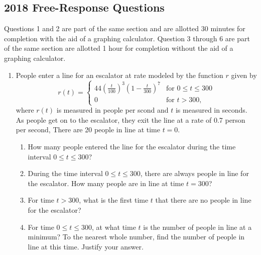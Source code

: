 \subsection{2018 Free-Response Questions}
Questions 1 and 2 are part of the same section and are allotted 30 minutes for completion with the aid of a graphing calculator.
Question 3 through 6 are part of the same section are allotted 1 hour for completion without the aid of a graphing calculator.

\begin{enumerate}
	\item People enter a line for an escalator at  rate modeled by the function $r$ given by
	\begin{equation*}
		r(t) = \begin{cases}
			44\left(\frac{t}{100}\right)^3\left(1-\frac{t}{300}\right)^7 & \text{for } 0 \leq t \leq 300 \\
			0 & \text{for } t > 300,
		\end{cases}
	\end{equation*}
	where $r(t)$ is measured in people per scond and $t$ is measured in seconds.
	As people get on to the escalator, they exit the line at a rate of 0.7 person per second,
	There are 20 people in line at time $t=0$.
	\begin{enumerate}
		\item How many people entered the line for the escalator during the time interval $0 \leq t \leq 300$?
		\item During the time interval $0 \leq t \leq 300$, there are always people in line for the escalator.
			How many people are in line at time $t=300$?
		\item For time $t > 300$, what is the first time $t$ that there are no people in line for the escalator?
		\item For time $0 \leq t \leq 300$, at what time $t$ is the number of people in line at a minimum?
			To the nearest whole number, find the number of people in line at this time.
			Justify your answer.
	\end{enumerate}


\end{enumerate}
